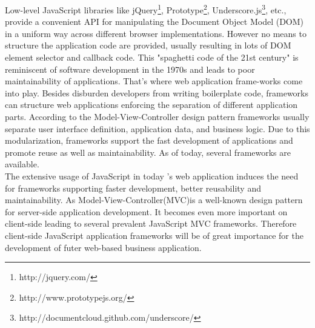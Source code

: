 \documentclass[14pt,a4paper]{extreport}
\begin{document}
Low-level JavaScript libraries like jQuery\footnote{http://jquery.com/}, Prototype\footnote{http://www.prototypejs.org/}, Underscore.js\footnote{http://documentcloud.github.com/underscore/}, etc., provide a convenient API for manipulating the Document Object Model (DOM) in a uniform way across different browser implementations. However no means to structure
the application code are provided, usually resulting in lots of DOM element selector and callback code\cite{Real}. This "spaghetti code of the 21st century" \cite{MT08} is reminiscent of software development in the 1970s and leads to poor maintainability of applications. That’s where web application frame-works come into play. Besides disburden developers from writing boilerplate code, frameworks can structure web applications enforcing the separation of different application parts. According to the Model-View-Controller design pattern \cite{Ree79b, Ree79a} frameworks usually separate user interface definition, application data, and business logic. Due to this modularization, frameworks support the fast development of applications and promote reuse as well as maintainability. As of today, several frameworks are available.
\\

The extensive usage of JavaScript in today 's web application induces the need for frameworks supporting faster development, better reusability and maintainability. As Model-View-Controller(MVC)is a well-known design pattern for server-side application development. It becomes even more important on client-side leading to several prevalent JavaScript MVC frameworks\cite{Real}. Therefore client-side JavaScript application frameworks will be of great importance for the development of futer web-based business application.
\\
\end{document}
